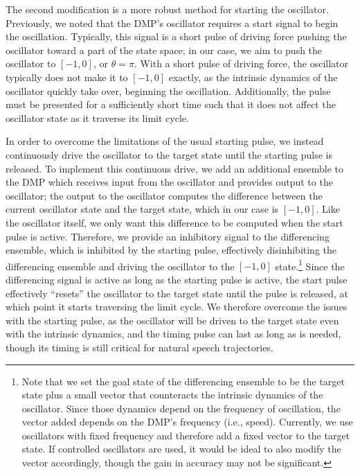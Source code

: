The second modification is a more robust
method for starting the oscillator.
Previously, we noted that the DMP's oscillator
requires a start signal to begin
the oscillation.
Typically, this signal is a short pulse
of driving force pushing the oscillator
toward a part of the state space;
in our case, we aim to push the oscillator
to $[-1, 0]$, or $\theta=\pi$.
With a short pulse of driving force,
the oscillator typically does not
make it to $[-1, 0]$ exactly,
as the intrinsic dynamics of the oscillator
quickly take over,
beginning the oscillation.
Additionally, the pulse
must be presented for a sufficiently short time
such that it does not affect
the oscillator state as it traverse
its limit cycle.

In order to overcome the limitations
of the usual starting pulse,
we instead continuously drive
the oscillator to the target state
until the starting pulse is released.
To implement this continuous drive,
we add an additional ensemble
to the DMP which receives input
from the oscillator
and provides output to the oscillator;
the output to the oscillator
computes the difference between
the current oscillator state
and the target state,
which in our case is $[-1, 0]$.
Like the oscillator itself,
we only want this difference
to be computed when the start pulse
is active.
Therefore, we provide an
inhibitory signal to the differencing ensemble,
which is inhibited by
the starting pulse,
effectively disinhibiting the differencing ensemble
and driving the oscillator
to the $[-1, 0]$ state.\footnote{
  Note that we set the goal state of the
  differencing ensemble to be the target state
  plus a small vector that counteracts the
  intrinsic dynamics of the oscillator.
  Since those dynamics depend on the frequency
  of oscillation, the vector added depends
  on the DMP's frequency (i.e., speed).
  Currently, we use oscillators with
  fixed frequency and therefore add a fixed vector
  to the target state.
  If controlled oscillators are used,
  it would be ideal to also modify
  the vector accordingly,
  though the gain in accuracy may not be significant.}
Since the differencing signal is active
as long as the starting pulse is active,
the start pulse effectively ``resets''
the oscillator to the target state
until the pulse is released,
at which point it starts
traversing the limit cycle.
We therefore overcome the issues with
the starting pulse,
as the oscillator will be driven
to the target state even
with the intrinsic dynamics,
and the timing pulse can
last as long as is needed,
though its timing is still critical
for natural speech trajectories.

